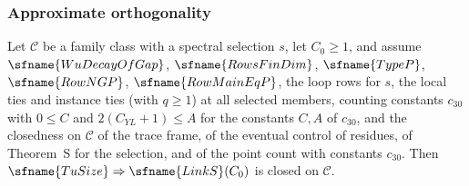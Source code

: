 \subsubsection*{Approximate orthogonality}

\begin{proposition}\label{pf:top-shape:thmS}
Let $\mathcal C$ be a family class with a spectral selection $s$, let $C_0\ge1$, and assume $\sfname{WuDecayOfGap}$,
$\sfname{RowsFinDim}$, $\sfname{TypeP}$, $\sfname{RowNGP}$, $\sfname{RowMainEqP}$, the loop rows for $s$, the local ties
and instance ties (with $q\ge1$) at all selected members, counting constants $c_{30}$ with $0\le C$ and
$2(C_{YL}+1)\le A$ for the constants $C,A$ of $c_{30}$, and the closedness on $\mathcal C$ of the trace frame, of the
eventual control of residues, of Theorem~S for the selection, and of the point count with constants $c_{30}$. Then
$\sfname{TuSize}\Rightarrow\sfname{LinkS}(C_0)$ is closed on $\mathcal C$.
\end{proposition}

